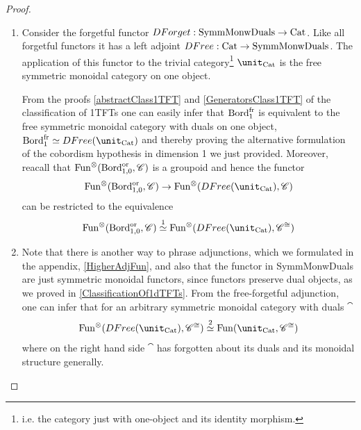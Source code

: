 \begin{proof}
\begin{enumerate}
\item Consider the forgetful functor $DForget:\operatorname{SymmMonwDuals}\to\operatorname{Cat}$. 
 Like all forgetful functors it has 
a left adjoint $DFree:\operatorname{Cat}\to\operatorname{SymmMonwDuals}$.
The application of this functor to the trivial category\footnote{i.e. the category just with one-object and its
	identity morphism.} $\unit_{\Cat}$ is the free symmetric monoidal category on one object.

From the proofs \ref{abstractClass1TFT} and \ref{GeneratorsClass1TFT} of the classification of 1TFTs
one can easily infer that $\operatorname{Bord}_{1}^{\operatorname{fr}}$ is equivalent to the free symmetric monoidal category with duals
on one object,
$\Bord_{1}^{\fr}\simeq DFree(\unit_{\Cat})$
and thereby proving the alternative formulation of the cobordism hypothesis in dimension 1 we just provided. Moreover,
reacall that $\operatorname{Fun}^{\otimes}(\operatorname{Bord}_{1,0}^{\operatorname{or}},\mathscr{C})$ is a groupoid and hence
the functor
$$\Fun^{\otimes}(\Bord_{1,0}^{\operatorname{or}},\cat)\to\Fun^{\otimes}(DFree(\unit_{\Cat}),\cat)$$
can be restricted to the equivalence
 $$\Fun^{\otimes}(\Bord_{1,0}^{\operatorname{or}},\cat)\overset{1}{\simeq}\Fun^{\otimes}(DFree(\unit_{\Cat}),\cat^{\cong})$$

\item Note that there is another way to phrase adjunctions, which we formulated in the appendix, \ref{HigherAdjFun}, and
also that the functor in SymmMonwDuals are just symmetric monoidal functors, since functors preserve dual
objects, as we proved in \ref{ClassificationOf1dTFTs}.
From the free-forgetful adjunction, one can infer that for an arbitrary symmetric monoidal category with duals $\cat$
$$\Fun^\otimes (DFree(\unit_{\Cat}),\cat^{\cong})\overset{2}{\simeq}\Fun(\unit_{\Cat},\cat^{\cong})$$
where on the right hand side $\cat$ has forgotten about its duals and its monoidal structure generally. 



\end{enumerate}
\end{proof}
